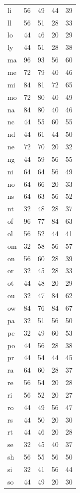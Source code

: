 \documentclass[ms,electronic,twosidetoc,letterpaper,chaptercenter,parttop,lof,lot]{byumsphd}
\begin{document}
\begin{longtable}{| l | c c | c c |}
  li & 56 & 49 & 44 & 39 \\
  ll & 56 & 51 & 28 & 33 \\
  lo & 44 & 46 & 20 & 29 \\
  ly & 44 & 51 & 28 & 38 \\
  ma & 96 & 93 & 56 & 60 \\
  me & 72 & 79 & 40 & 46 \\
  mi & 84 & 81 & 72 & 65 \\
  mo & 72 & 80 & 40 & 49 \\
  na & 84 & 80 & 40 & 46 \\
  nc & 44 & 55 & 60 & 55 \\
  nd & 44 & 61 & 44 & 50 \\
  ne & 72 & 70 & 20 & 32 \\
  ng & 44 & 59 & 56 & 55 \\
  ni & 64 & 64 & 56 & 49 \\
  no & 64 & 66 & 20 & 33 \\
  ns & 64 & 63 & 56 & 52 \\
  nt & 32 & 48 & 28 & 37 \\
  of & 96 & 77 & 84 & 63 \\
  ol & 56 & 52 & 44 & 41 \\
  om & 32 & 58 & 56 & 57 \\
  on & 56 & 60 & 28 & 39 \\
  or & 32 & 45 & 28 & 33 \\
  ot & 44 & 48 & 20 & 29 \\
  ou & 32 & 47 & 84 & 62 \\
  ow & 84 & 76 & 84 & 67 \\
  pa & 32 & 51 & 56 & 50 \\
  pe & 32 & 49 & 60 & 53 \\
  po & 44 & 56 & 28 & 38 \\
  pr & 44 & 54 & 44 & 45 \\
  ra & 64 & 60 & 28 & 37 \\
  re & 56 & 54 & 20 & 28 \\
  ri & 56 & 52 & 20 & 27 \\
  ro & 44 & 49 & 56 & 47 \\
  rs & 44 & 50 & 20 & 30 \\
  rt & 44 & 46 & 20 & 28 \\
  se & 32 & 45 & 40 & 37 \\
  sh & 56 & 55 & 56 & 50 \\
  si & 32 & 41 & 56 & 44 \\
  so & 44 & 49 & 20 & 30 \\

\end{longtable}
\end{document}
